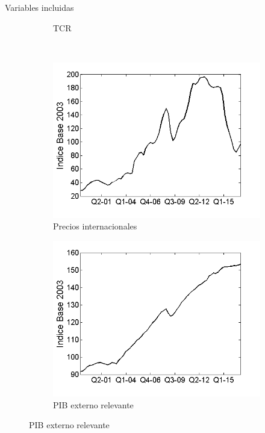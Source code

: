 \documentclass[12pt]{beamer}
\begin{document}
\begin{frame}{Variables incluidas}
\begin{figure}
\begin{subfigure}[b]{0.3\textwidth}
        \caption{\tiny TCR}
        \label{3tcr}
    \end{subfigure}
    ~ %
    \begin{subfigure}[b]{0.3\textwidth}
        \includegraphics[width=\textwidth]{5ippbx}
        \caption{\tiny Precios internacionales}
        \label{5ippbx}
    \end{subfigure}
    \begin{subfigure}[b]{0.3\textwidth}
        \includegraphics[width=\textwidth]{2per}
        \caption{\tiny PIB externo relevante}
        \label{2per}
    \end{subfigure}

\end{figure}
\end{frame}
\end{document}
